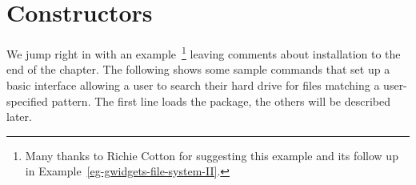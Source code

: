 






\section{Constructors}
\label{sec:constructors}

We jump right in with an example~\footnote{Many thanks to Richie
  Cotton for suggesting this example and its follow up in
  Example~\ref{eg-gwidgets-file-system-II}.} leaving comments about
installation to the end of the chapter. The following shows some
sample  commands that set up a basic interface allowing
a user to search their hard drive for files matching a user-specified
pattern. The first line loads the package, the others will be
described later.



